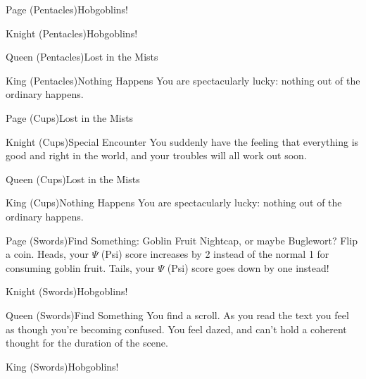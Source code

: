 \documentclass[green]{gl2018}
\begin{document}
\begin{location}{Page (Pentacles)}{Hobgoblins!}
\end{location}
\begin{location}{Knight (Pentacles)}{Hobgoblins!}
\end{location}
\begin{location}{Queen (Pentacles)}{Lost in the Mists}
\end{location}
\begin{location}{King (Pentacles)}{Nothing Happens}
You are spectacularly lucky: nothing out of the ordinary happens.
\end{location}
\begin{location}{Page (Cups)}{Lost in the Mists}
\end{location}
\begin{location}{Knight (Cups)}{Special Encounter}
You suddenly have the feeling that everything is good and right in the world, and your troubles will all work out soon.
\end{location}
\begin{location}{Queen (Cups)}{Lost in the Mists}
\end{location}
\begin{location}{King (Cups)}{Nothing Happens}
You are spectacularly lucky: nothing out of the ordinary happens.
\end{location}
\begin{location}{Page (Swords)}{Find Something: Goblin Fruit}
Nightcap, or maybe Buglewort?  Flip a coin.  Heads, your $\Psi$ (Psi) score increases by 2 instead of the normal 1 for consuming goblin fruit. Tails, your $\Psi$ (Psi) score goes down by one instead!
\end{location}
\begin{location}{Knight (Swords)}{Hobgoblins!}
\end{location}
\begin{location}{Queen (Swords)}{Find Something}
You find a scroll. As you read the text you feel as though you're becoming confused.  You feel dazed, and can't hold a coherent thought for the duration of the scene.
\end{location}
\begin{location}{King (Swords)}{Hobgoblins!}
\end{location}
\end{document}
